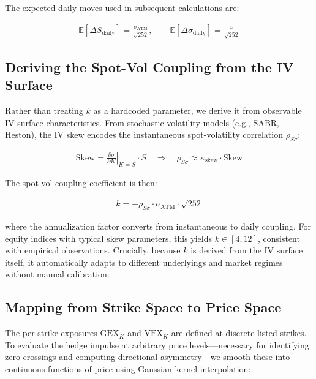 \documentclass[11pt, a4paper]{article}
\begin{document}
The expected daily moves used in subsequent calculations are:

\begin{align}
\mathbb{E}[\Delta S_{\text{daily}}] = \frac{\sigma_{\text{ATM}}}{\sqrt{252}}, \qquad
\mathbb{E}[\Delta \sigma_{\text{daily}}] = \frac{\nu}{\sqrt{252}}
\end{align}

\subsection{Deriving the Spot-Vol Coupling from the IV Surface}
\label{subsec:k-derivation}

Rather than treating $k$ as a hardcoded parameter, we derive it from observable IV surface characteristics. From stochastic volatility models (e.g., SABR, Heston), the IV skew encodes the instantaneous spot-volatility correlation $\rho_{S\sigma}$:

\begin{align}
\text{Skew} = \left.\frac{\partial \sigma}{\partial K}\right|_{K=S} \cdot S \quad \Longrightarrow \quad \rho_{S\sigma} \approx \kappa_{\text{skew}} \cdot \text{Skew}
\end{align}

The spot-vol coupling coefficient is then:

\begin{align}
k = -\rho_{S\sigma} \cdot \sigma_{\text{ATM}} \cdot \sqrt{252}
\end{align}

where the annualization factor converts from instantaneous to daily coupling. For equity indices with typical skew parameters, this yields $k \in [4, 12]$, consistent with empirical observations. Crucially, because $k$ is derived from the IV surface itself, it automatically adapts to different underlyings and market regimes without manual calibration.

\subsection{Mapping from Strike Space to Price Space}
\label{subsec:kernel-smoothing}

The per-strike exposures $\text{GEX}_K$ and $\text{VEX}_K$ are defined at discrete listed strikes. To evaluate the hedge impulse at arbitrary price levels---necessary for identifying zero crossings and computing directional asymmetry---we smooth these into continuous functions of price using Gaussian kernel interpolation:
\end{document}
